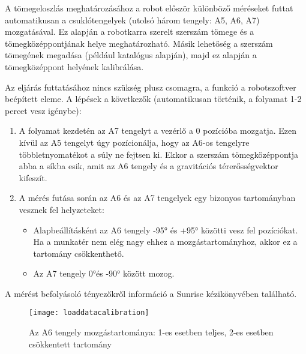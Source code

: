 \documentclass[../documentation.tex]{subfiles}
\begin{document}
A tömegeloszlás meghatározásához a robot először különböző méréseket futtat automatikusan a csuklótengelyek (utolsó három tengely: A5, A6, A7) mozgatásával. Ez alapján a robotkarra szerelt szerszám tömege és a tömegközéppontjának helye meghatározható. Másik lehetőség a szerszám tömegének megadása (például katalógus alapján), majd ez alapján a tömegközéppont helyének kalibrálása.

Az eljárás futtatásához nincs szükség plusz csomagra, a funkció a robotszoftver beépített eleme. A lépések a következők (automatikusan történik, a folyamat 1-2 percet vesz igénybe):
\begin{enumerate}
	\item A folyamat kezdetén az A7 tengelyt a vezérlő a 0 pozícióba mozgatja. Ezen kívül az A5 tengelyt úgy pozícionálja, hogy az A6-os tengelyre többletnyomatékot a súly ne fejtsen ki. Ekkor a szerszám tömegközéppontja abba a síkba esik, amit az A6 tengely és a gravitációs térerősségvektor kifeszít.
	\item A mérés futása során az A6 és az A7 tengelyek egy bizonyos tartományban vesznek fel helyzeteket:
	\begin{itemize}
		\item Alapbeállításként az A6 tengely -95° és +95° közötti vesz fel pozíciókat.
		Ha a munkatér nem elég nagy ehhez a mozgástartományhoz, akkor ez a tartomány csökkenthető.
		\item Az A7 tengely 0°és -90° között mozog.
	\end{itemize}
\end{enumerate}

A mérést befolyásoló tényezőkről információ a Sunrise kézikönyvében\cite{sunrisemanual} található.

\begin{figure}[h]
	\centering
	\texttt{[image: loaddatacalibration]}
	\caption{Az A6 tengely mozgástartománya: 1-es esetben teljes, 2-es esetben csökkentett tartomány\cite{sunrisemanual}}
	\label{fig:loaddatacalibration}
\end{figure}
\end{document}
